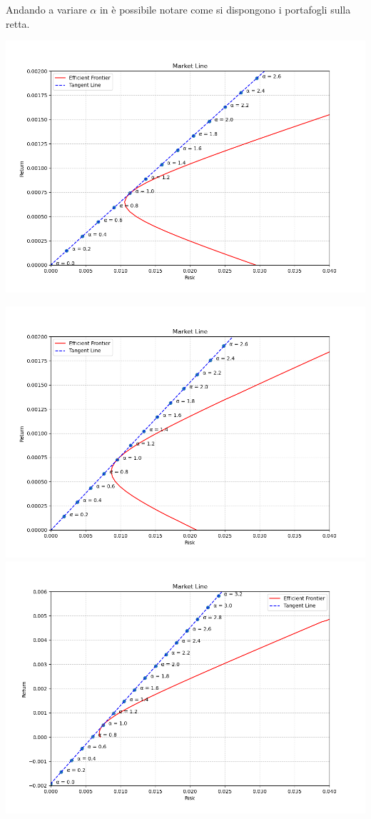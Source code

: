 \documentclass[compress]{beamer}
\begin{document}
\begin{frame}{\subsecname}
	Andando a variare \(\alpha\) in è possibile notare come si dispongono i portafogli sulla retta. \\
	\vspace{-0.6cm}
	\begin{minipage}{0.65\textwidth}
		\centering
		\includegraphics[width=1\linewidth]{images/Daily2.png}
	\end{minipage}
	\hfill
	\begin{minipage}{0.30\textwidth}
		\centering
		\includegraphics[width=1\linewidth]{images/Weekly2.png}
		\includegraphics[width=0.95\linewidth]{images/Monthly2.png}

\end{minipage}
\end{frame}
\end{document}
